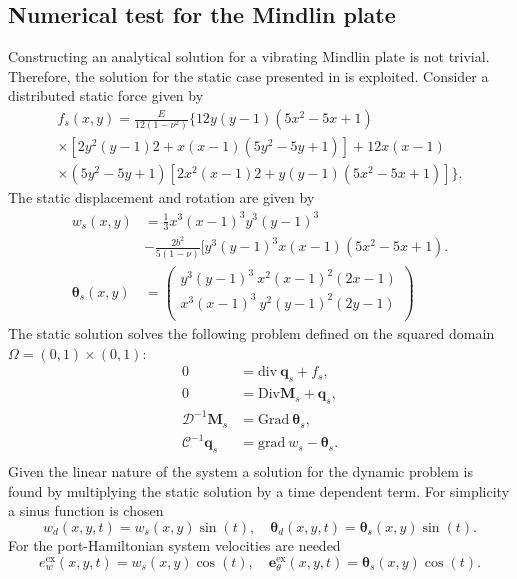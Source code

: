 \documentclass{ifacconf}
\begin{document}
\subsection{Numerical test for the Mindlin plate}
Constructing an analytical solution for a vibrating Mindlin plate is not trivial. Therefore, the solution for the static case presented in \cite{mindlinVeiga} is exploited. Consider a distributed static force given by 
\begin{equation*}
\begin{aligned}
f_s(x,y)=\frac{E}{12 (1-\nu^2)} \{12 y(y-1)(5x^2-5x+1)\\
\times [2y^2(y-1)2+x(x-1)(5y^2-5y+1)] +12x(x-1)\\
\times (5y^2-5y+1)[2x^2(x-1)2+y(y-1)(5x^2-5x+1)]\}.
\end{aligned}
\end{equation*}
The static displacement and rotation are given by
\begin{align*}
	w_s(x,y) &= \frac{1}{3} x^3(x-1)^3 y^3 (y-1)^3\\
	&-\frac{2 b^2}{5(1-\nu)}[y^3(y-1)^3 x(x-1)(5 x^2-5x+1). \\
	\bm{\theta}_{s}(x,y) &= 
	\begin{pmatrix}
	y^3(y-1)^3 \ x^2 (x-1)^2 (2x-1) \\
	x^3(x-1)^3 \ y^2 (y-1)^2 (2y-1) \\
	\end{pmatrix}
\end{align*}
The static solution solves the following problem defined on the squared domain $\Omega=(0,1)\times(0,1)$:
\begin{equation}
\begin{aligned}
0 &= \mathrm{div} \ \bm{q}_s + f_s , \\
0 &= \mathrm{Div} \bm{M}_s + \bm{q}_s, \\
\mathcal{D}^{-1} \bm{M}_s &= \mathrm{Grad} \ \bm{\theta}_s, \\
\mathcal{C}^{-1} \bm{q}_s &= \mathrm{grad} \ w_s - \bm{\theta}_s. \\
\end{aligned}
\end{equation}
Given the linear nature of the system a solution for the dynamic problem is found by multiplying the static solution by a time dependent term. For simplicity a sinus function is chosen
\[
w_d(x,y,t) = w_s(x,y) \sin(t), \quad \bm{\theta}_d(x,y,t) = \bm\theta_s(x,y) \sin(t).
\]
For the port-Hamiltonian system velocities are needed
\[
e_w^\text{ex}(x,y,t) = w_s(x,y) \cos(t), \quad \bm{e}_\theta^\text{ex}(x,y,t) = \bm\theta_s(x,y) \cos(t).
\]
\end{document}
